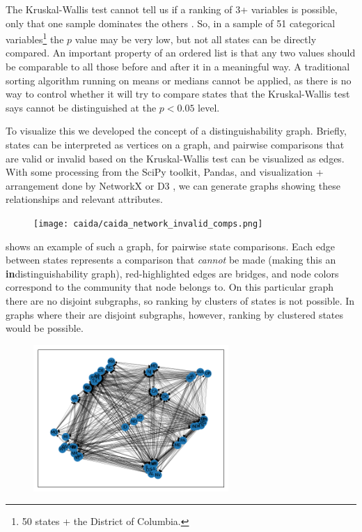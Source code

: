 The Kruskal-Wallis test cannot tell us if a ranking of 3+ variables is possible, only that one sample dominates the others \cite{kruskal-wallis}. So, in a sample of 51 categorical variables\footnote{50 states + the District of Columbia.} the $p$ value may be very low, but not all states can be directly compared. An important property of an ordered list is that any two values should be comparable to all those before and after it in a meaningful way. A traditional sorting algorithm running on means or medians cannot be applied, as there is no way to control whether it will try to compare states that the Kruskal-Wallis test says cannot be distinguished at the $p<0.05$ level.

To visualize this we developed the concept of a distinguishability graph. Briefly, states can be interpreted as vertices on a graph, and pairwise comparisons that are valid or invalid based on the Kruskal-Wallis test can be visualized as edges. With some processing from the SciPy toolkit, Pandas, and visualization + arrangement done by NetworkX or D3 \cite{scipy, pandas, networkx, Bostock2011a}, we can generate graphs showing these relationships and relevant attributes.

\begin{figure}[h]
    \centering
    \texttt{[image: caida/caida\_network\_invalid\_comps.png]}
\end{figure}

 shows an example of such a graph, for pairwise state comparisons. Each edge between states represents a comparison that \textit{cannot} be made (making this an \textbf{in}distinguish\-ability graph), red-highlighted edges are bridges, and node colors correspond to the community that node belongs to. On this particular graph there are no disjoint subgraphs, so ranking by clusters of states is not possible. In graphs where their are disjoint subgraphs, however, ranking by clustered states would be possible.

\begin{figure}[h]
    \centering
    \includegraphics[width=0.66\textwidth]{images/caida/caida_network_valid_comps.png}
\end{figure}

